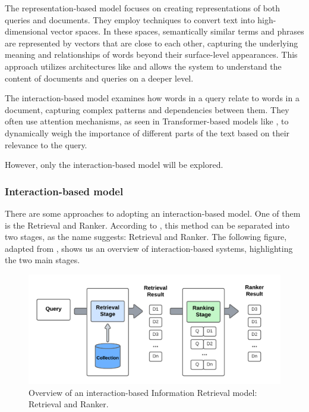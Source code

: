 The representation-based model focuses on creating representations of both queries and documents. They employ techniques to convert text into high-dimensional vector spaces. In these spaces, semantically similar terms and phrases are represented by vectors that are close to each other, capturing the underlying meaning and relationships of words beyond their surface-level appearances. This approach utilizes architectures like {\rnn} and allows the system to understand the content of documents and queries on a deeper level. 

The interaction-based model examines how words in a query relate to words in a document, capturing complex patterns and dependencies between them. They often use attention mechanisms, as seen in Transformer-based models like {\bert}, to dynamically weigh the importance of different parts of the text based on their relevance to the query.

However, only the interaction-based model will be explored.


\subsubsection{Interaction-based model}

There are some approaches to adopting an interaction-based model. One of them is the Retrieval and Ranker. According to \citet{hambarde_information_2023}, this method can be separated into two stages, as the name suggests: Retrieval and Ranker. The following figure, adapted from \citet{hambarde_information_2023}, shows us an overview of interaction-based {\ir} systems, highlighting the two main stages.

\begin{figure}[ht]
    \includegraphics[width=14cm]{figs/chapter2/IR_system.png}
    \centering
    \caption{Overview of an interaction-based Information Retrieval model: Retrieval and Ranker.}
    \label{fig_ir_system}
\end{figure}

